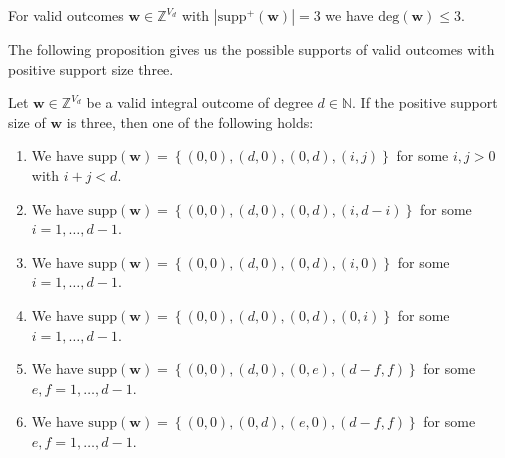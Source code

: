 \begin{theorem}\label{thm:sfnjksnfjkwenjfk}
    For valid outcomes \( \mathbf w \in \mathbb{Z}^{V_d}  \) with \( |\mathrm{supp}^+(\mathbf w)| = 3 \) we have \( \mathrm{deg}(\mathbf w) \leq 3 \).
\end{theorem}

The following proposition gives us the possible supports of valid outcomes with positive support size three.

\begin{proposition}\label{lemma:wmrkwjnr3w}
    Let \( \mathbf{w} \in \mathbb{Z}^{V_d} \) be a valid integral outcome of degree \( d \in \mathbb{N} \). If the positive support size of \( \mathbf{w} \) is three, then one of the following holds:
    \begin{enumerate}
        \item We have \( \mathrm{supp}(\mathbf{w}) = \left\{ (0,0), (d,0), (0,d), (i,j) \right\} \) for some \( i,j > 0 \) with \( i+j < d \).
        \item We have \( \mathrm{supp}(\mathbf{w}) = \left\{ (0,0), (d,0), (0,d), (i,d-i) \right\} \) for some \( i = 1, \dots, d-1 \).
        \item We have \( \mathrm{supp}(\mathbf{w}) = \left\{ (0,0), (d,0), (0,d), (i,0) \right\} \) for some \( i = 1, \dots, d-1 \).
        \item We have \( \mathrm{supp}(\mathbf{w}) = \left\{ (0,0), (d,0), (0,d), (0,i) \right\} \) for some \( i = 1, \dots, d-1 \).
        \item We have \( \mathrm{supp}(\mathbf{w}) = \left\{ (0,0), (d,0), (0,e), (d-f,f) \right\} \) for some \( e,f = 1 , \dots, d-1 \).
        \item We have \( \mathrm{supp}(\mathbf{w}) = \left\{ (0,0), (0,d), (e,0), (d-f,f) \right\} \) for some \( e,f = 1 , \dots, d-1 \).
    \end{enumerate}
\end{proposition}

